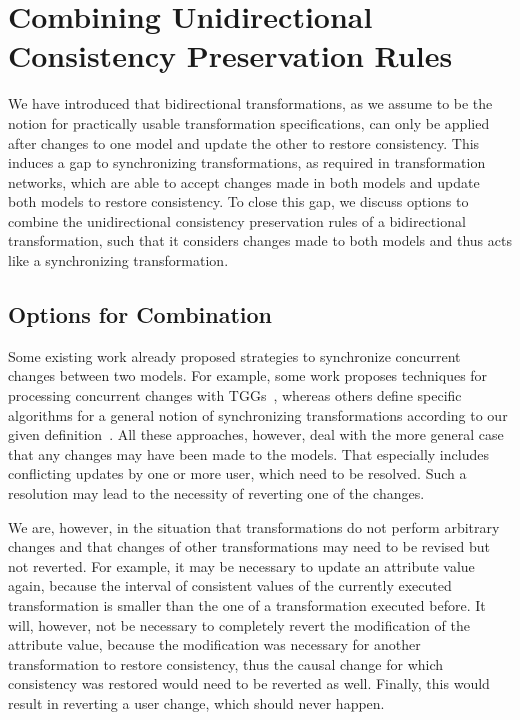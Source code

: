 \section{Combining Unidirectional Consistency Preservation Rules}

We have introduced that bidirectional transformations, as we assume to be the notion for practically usable transformation specifications, can only be applied after changes to one model and update the other to restore consistency.
This induces a gap to synchronizing transformations, as required in transformation networks, which are able to accept changes made in both models and update both models to restore consistency.
To close this gap, we discuss options to combine the unidirectional consistency preservation rules of a bidirectional transformation, such that it considers changes made to both models and thus acts like a synchronizing transformation.


\subsection{Options for Combination}

Some existing work already proposed strategies to synchronize concurrent changes between two models.
For example, some work proposes techniques for processing concurrent changes with \glspl{TGG}~\cite{hermann2012concurrentSynchronization-FASE,orejas2020IncrementalConcurrentSynchronization-FASE}, whereas others define specific algorithms for a general notion of synchronizing transformations according to our given definition~\cite{xiong2013SynchronizingConcurrentUpdates-SoSym,xiong2009parallelUpdates-ICMT}.
All these approaches, however, deal with the more general case that any changes may have been made to the models.
That especially includes conflicting updates by one or more user, which need to be resolved.
Such a resolution may lead to the necessity of reverting one of the changes.

We are, however, in the situation that transformations do not perform arbitrary changes and that changes of other transformations may need to be revised but not reverted.
For example, it may be necessary to update an attribute value again, because the interval of consistent values of the currently executed transformation is smaller than the one of a transformation executed before.
It will, however, not be necessary to completely revert the modification of the attribute value, because the modification was necessary for another transformation to restore consistency, thus the causal change for which consistency was restored would need to be reverted as well.
Finally, this would result in reverting a user change, which should never happen.

